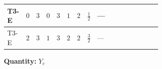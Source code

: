 \documentclass[8pt]{article}
\begin{document}
\begin{landscape}
\begin{longtable}{@{}llcccccc >{\raggedright\arraybackslash}p{0.21\linewidth} >{\raggedright\arraybackslash}p{0.21\linewidth} >{\raggedright\arraybackslash}p{0.21\linewidth}@{}}
\midrule
T3-E & $0$ & $3$ & $0$ & $3$ & $1$ & $2$ & $\frac{1}{2}$ & --- & \scriptsize\adjustbox{max width=\linewidth}{$\begin{gathered} -\frac{9}{4} {g_2}^2 \left({Y_e}\right)_{ij}\end{gathered}$} & \scriptsize\adjustbox{max width=\linewidth}{$\begin{gathered} -\frac{15}{4} {g_1}^2 \left({Y_e}\right)_{ij}\end{gathered}$} \\
\midrule
T3-E & $2$ & $3$ & $1$ & $3$ & $2$ & $2$ & $\frac{3}{2}$ & --- & \scriptsize\adjustbox{max width=\linewidth}{$\begin{gathered} -\frac{9}{4} {g_2}^2 \left({Y_e}\right)_{ij}\end{gathered}$} & \scriptsize\adjustbox{max width=\linewidth}{$\begin{gathered} -\frac{15}{4} {g_1}^2 \left({Y_e}\right)_{ij}\end{gathered}$} \\
\midrule
\bottomrule
\end{longtable}
\clearpage
\noindent\textbf{Quantity: }$Y_e$\par\smallskip

\end{landscape}
\end{document}

